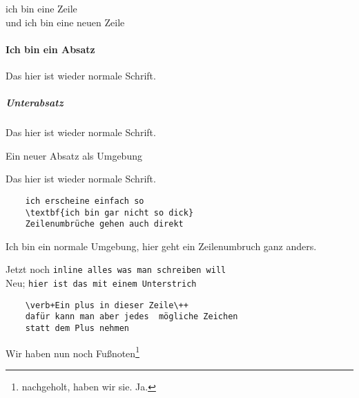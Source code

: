     ich bin eine Zeile\\
    und ich bin eine neuen Zeile
    
    \paragraph{Ich bin ein Absatz \blindtext}
        Das hier ist wieder normale Schrift.
    \subparagraph{Unterabsatz \blindtext}
        Das hier ist wieder normale Schrift.
    
    \begin{paragraph}
        Ein neuer Absatz als Umgebung \blindtext
    \end{paragraph}

    Das hier ist wieder normale Schrift.
    
    \begin{verbatim}
    ich erscheine einfach so
    \textbf{ich bin gar nicht so dick}
    Zeilenumbrüche gehen auch direkt
    \end{verbatim}
    
    Ich bin ein normale Umgebung, hier geht
    ein Zeilenumbruch ganz anders.
    
    Jetzt noch \verb+inline alles was man schreiben will+ \\
    Neu; \verb_hier ist das mit einem Unterstrich_ \\
    
    \begin{verbatim}
    \verb+Ein plus in dieser Zeile\++
    dafür kann man aber jedes  mögliche Zeichen
    statt dem Plus nehmen
    \end{verbatim}

    
    Wir haben nun noch Fußnoten\footnote{nachgeholt, haben wir sie. Ja.}